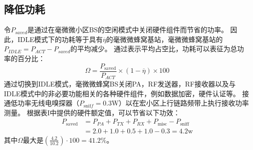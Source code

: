 \documentclass{article}
\begin{document}
\subsection{降低功耗}
令$ P_ {saved} $是通过在毫微微小区BS的空闲模式中关闭硬件组件而节省的功率。
因此，IDLE模式下的功耗等于具有$\overline{\eta}$的毫微微蜂窝基站，毫微微蜂窝基站的$P_{I D L E}=P_{A C T}-P_{s a v e d}$的平均减少。
通过表示平均占空比，功耗可以表征为总功率的百分比：$$
\Omega=\frac{P_{\text {saved}}}{P_{A C T}} \times(1-\overline{\eta}) \times 100
$$
通过切换到IDLE模式，毫微微蜂窝BS关闭PA，RF发送器，RF接收器以及与IDLE模式中的非必要功能相关的各种硬件组件，例如数据加密，硬件认证等。
接通低功率无线电嗅探器（$P_{\text {snif} f}=0.3 \mathrm{W}$）以在宏小区上行链路频带上执行接收功率测量。
根据表I中提供的硬件额定值，可以节省以下功效：$$
\begin{aligned} P_{\text {saved}} &=P_{P A}+P_{T X}+P_{R X}+P_{\text {misc}}-P_{\text {sniff}} \\ &=2.0+1.0+0.5+1.0-0.3=4.2 \mathrm{w} \end{aligned}
$$
其中$\Omega$最大是$\left(\frac{4.2}{10.2}\right) \cdot 100=41.2 \%$。



\end{document}
